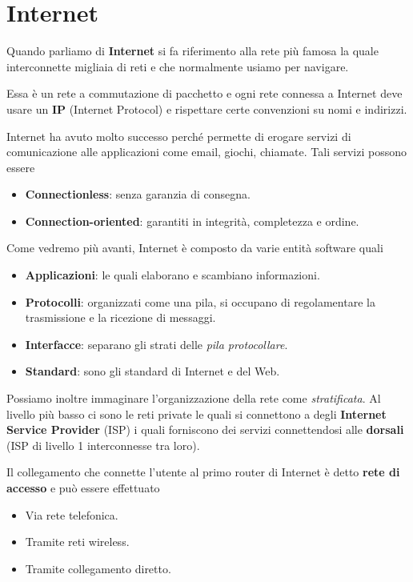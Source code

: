\section{Internet}
Quando parliamo di \textbf{Internet} si fa riferimento alla rete più 
famosa la quale interconnette migliaia di reti e che normalmente usiamo
per navigare.

Essa è un rete a commutazione di pacchetto e ogni rete connessa a 
Internet deve usare un \textbf{IP} (Internet Protocol) e rispettare 
certe convenzioni su nomi e indirizzi.

Internet ha avuto molto successo perché permette di erogare servizi 
di comunicazione alle applicazioni come email, giochi, chiamate. Tali 
servizi possono essere
\begin{itemize}
	\item \textbf{Connectionless}: senza garanzia di consegna.
	\item \textbf{Connection-oriented}: garantiti in integrità, 
		completezza e ordine.
\end{itemize}
Come vedremo più avanti, Internet è composto da varie entità software 
quali
\begin{itemize}
	\item \textbf{Applicazioni}: le quali elaborano e scambiano 
		informazioni.
	\item \textbf{Protocolli}: organizzati come una pila, si occupano 
		di regolamentare la trasmissione e la ricezione di messaggi.
	\item \textbf{Interfacce}: separano gli strati delle 
		\emph{pila protocollare}.
	\item \textbf{Standard}: sono gli standard di Internet e del Web.
\end{itemize}
Possiamo inoltre immaginare l'organizzazione della rete come
\emph{stratificata}. Al livello più basso ci sono le reti private le 
quali si connettono a degli \textbf{Internet Service Provider} (ISP)
i quali forniscono dei servizi connettendosi alle \textbf{dorsali} 
(ISP di livello 1 interconnesse tra loro).

Il collegamento che connette l'utente al primo router di Internet è 
detto \textbf{rete di accesso} e può essere effettuato
\begin{itemize}
	\item Via rete telefonica.
	\item Tramite reti wireless.
	\item Tramite collegamento diretto.
\end{itemize}

